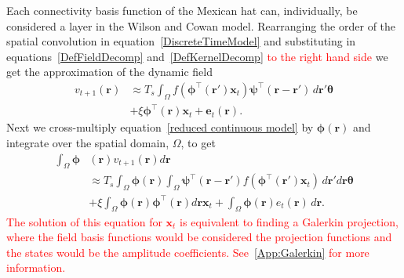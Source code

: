 \documentclass[review,authoryear,3p]{elsarticle}
\newcommand{\dean}[1]{\textcolor{red}{#1}}
\begin{document}
Each connectivity basis function of the Mexican hat can, individually, be considered a layer in the Wilson and Cowan model. Rearranging the order of the spatial convolution in equation~\ref{DiscreteTimeModel} and substituting in equations~\ref{DefFieldDecomp} and~\ref{DefKernelDecomp} \dean{to the right hand side} we get the approximation of the dynamic field
\begin{align}
	\label{reduced continuous model}
	v_{t+1}\left(\mathbf{r}\right) &\approx T_s\int_\Omega{f(\boldsymbol{\phi}^{\top}(\mathbf{r}')\mathbf{x}_t )\boldsymbol{\psi}^{\top}(\mathbf{r}-\mathbf{r}') \, d\mathbf{r}'}\boldsymbol{\theta} \nonumber \\
	&+ \xi\boldsymbol{\phi}^{\top}(\mathbf{r})\mathbf{x}_t + \mathbf{e}_t(\mathbf{r}). 
\end{align}
Next we cross-multiply equation~\ref{reduced continuous model} by $\boldsymbol{\phi}(\mathbf{r})$ and integrate over the spatial domain, $\Omega$, to get 
\begin{align}
	\label{eq:decompRHS}
 	\int_\Omega \boldsymbol{\phi}&\left(\mathbf{r}\right) v_{t+1}\left(\mathbf{r}\right)d\mathbf{r}  \nonumber \\
	&\approx T_s \int_\Omega \boldsymbol{\phi} (\mathbf{r}) \int_\Omega \boldsymbol{\psi}^{\top} (\mathbf{r}-\mathbf{r}') f(\boldsymbol{\phi}^{\top}(\mathbf{r}') \mathbf{x}_t ) \, d\mathbf{r}'d\mathbf{r}\boldsymbol{\theta} \nonumber \\ 
	&+ \xi\int_\Omega {\boldsymbol{\phi}(\mathbf{r}) \boldsymbol{\phi}^{\top}(\mathbf{r})d\mathbf{r} } \mathbf{x}_t + \int_\Omega{\boldsymbol{\phi} (\mathbf{r}) e_t(\mathbf{r}) \, d\mathbf{r}}. 
\end{align}
\dean{The solution of this equation for $\mathbf{x}_t$ is equivalent to finding a Galerkin projection, where the field basis functions would be considered the projection functions and the states would be the amplitude coefficients. See~\ref{App:Galerkin} for more information.} 
\end{document}
